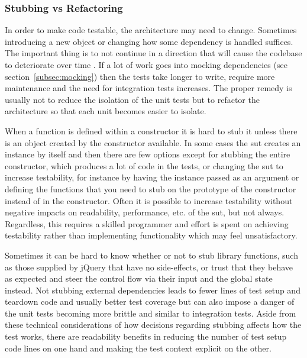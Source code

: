 \documentclass[11pt]{article}
\begin{document}
\subsubsection{Stubbing vs Refactoring}

In order to make code testable, the architecture may need to change. Sometimes introducing a new object or changing how some dependency is handled suffices. The important thing is to not continue in a direction that will cause the codebase to deteriorate over time \cite[question~34]{Stenmark}. If a lot of work goes into mocking dependencies (see section~\ref{subsec:mocking}) then the tests take longer to write, require more maintenance and the need for integration tests increases. The proper remedy is usually not to reduce the isolation of the unit tests but to refactor the architecture so that each unit becomes easier to isolate. \cite[question~42]{Stenmark}

When a function is defined within a constructor it is hard to stub it unless there is an object created by the constructor available. In some cases the \gls{sut} creates an instance by itself and then there are few options except for stubbing the entire constructor, which produces a lot of code in the tests, or changing the \gls{sut} to increase testability, for instance by having the instance passed as an argument or defining the functions that you need to stub on the prototype of the constructor instead of in the constructor. Often it is possible to increase testability without negative impacts on readability, performance, etc. of the \gls{sut}, but not always. Regardless, this requires a skilled programmer and effort is spent on achieving testability rather than implementing functionality which may feel unsatisfactory.

Sometimes it can be hard to know whether or not to stub library functions, such as those supplied by jQuery that have no side-effects, or trust that they behave as expected and steer the control flow via their input and the global state instead. Not stubbing external dependencies leads to fewer lines of test setup and teardown code and usually better test coverage but can also impose a danger of the unit tests becoming more brittle and similar to integration tests. Aside from these technical considerations of how decisions regarding stubbing affects how the test works, there are readability benefits in reducing the number of test setup code lines on one hand and making the test context explicit on the other.
\end{document}
